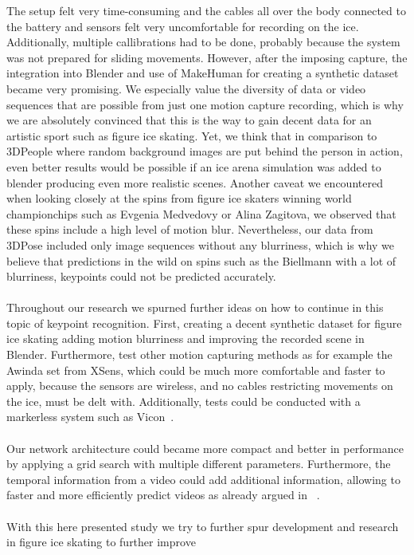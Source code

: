 The setup felt very time-consuming and the cables all over the body connected to the battery and sensors felt very uncomfortable
for recording on the ice.
Additionally, multiple callibrations had to be done, probably because the system was not prepared
for sliding movements.
However, after the imposing capture, the integration into Blender and use of MakeHuman for creating a synthetic dataset
became very promising.
We especially value the diversity of data or video sequences that are possible from just one motion capture recording,
which is why we are absolutely convinced that this is the way to gain decent data for an artistic sport such as figure
ice skating.
Yet, we think that in comparison to 3DPeople where random background images are put behind the person in action, even
better results would be possible if an ice arena simulation was added to blender producing even more realistic scenes.
Another caveat we encountered when looking closely at the spins from figure ice skaters winning world championchips such as
Evgenia Medvedovy or Alina Zagitova, we observed that these spins include a high level of motion blur.
Nevertheless, our data from 3DPose included only image sequences without any blurriness, which is why we believe that
predictions in the wild on spins such as the Biellmann with a lot of blurriness, keypoints could not be predicted accurately.
\\\mbox{}\\
Throughout our research we spurned further ideas on how to continue in this topic of keypoint recognition.
First, creating a decent synthetic dataset for figure ice skating adding motion blurriness and improving the recorded scene
in Blender.
Furthermore, test other motion capturing methods as for example the Awinda set from XSens, which could be much more comfortable
and faster to apply, because the sensors are wireless, and no cables restricting movements on the ice, must be delt with.
Additionally, tests could be conducted with a markerless system such as Vicon~\cite{mocapoptical}.
\\\mbox{}\\
Our network architecture could became more compact and better in performance by applying a grid search with multiple different
parameters.
Furthermore, the temporal information from a video could add additional information, allowing to faster and more efficiently
predict videos as already argued in ~\cite{staf}.
\\\mbox{}\\
With this here presented study we try to further spur development and research in figure ice skating to further improve

